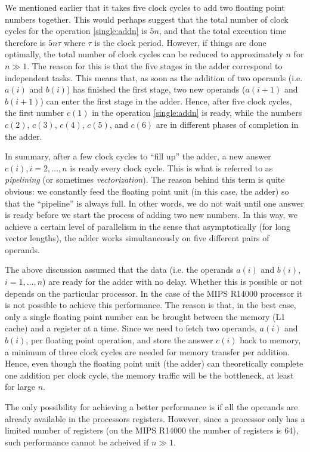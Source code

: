 We mentioned earlier that it takes five clock cycles to add two floating point
numbers together. This would perhaps suggest that the total number of clock
cycles for the operation \eqref{single:addn} is $5n$, and that the total
execution time therefore is $5n\tau$ where $\tau$ is the clock period. However,
if things are done optimally, the total number of clock cycles can be reduced to
approximately $n$ for $n\gg 1$. The reason for this is that the five stages in
the adder correspond to independent tasks. This means that, as soon as the
addition of two operands (i.e. $a(i)$ and $b(i)$) has finished the first stage,
two new operands ($a(i+1)$ and $b(i+1)$) can enter the first stage in the adder.
Hence, after five clock cycles, the first number $c(1)$ in the operation
\eqref{single:addn} is ready, while the numbers $c(2)$, $c(3)$, $c(4)$, $c(5)$,
and $c(6)$ are in different phases of completion in the adder.

In summary, after a few clock cycles to ``fill up'' the adder, a new answer
$c(i), i=2,\ldots,n$ is ready every clock cycle. This is what is referred to as
\emph{pipelining} (or sometimes \emph{vectorization}). The reason behind this
term is quite obvious: we constantly feed the floating point unit (in this case,
the adder) so that the ``pipeline'' is always full. In other words, we do not
wait until one answer is ready before we start the process of adding two new
numbers. In this way, we achieve a certain level of parallelism in the sense
that asymptotically (for long vector lengths), the adder works simultaneously on
five different pairs of operands.

The above discussion assumed that the data (i.e. the operands $a(i)$ and $b(i)$,
$i=1,\ldots,n$) are ready for the adder with no delay. Whether this is possible
or not depends on the particular processor. In the case of the MIPS R14000
processor it is not possible to achieve this performance. The reason is that,
in the best case, only a single floating point number can be brought between the
memory (L1 cache) and a register at a time. Since we need to fetch two operands,
$a(i)$ and $b(i)$, per floating point operation, and store the answer $c(i)$
back to memory, a minimum of three clock cycles are needed for memory transfer
per addition. Hence, even though the floating point unit (the adder) can
theoretically complete one addition per clock cycle, the memory traffic will be
the bottleneck, at least for large $n$.

The only possibility for achieving a better performance is if all the operands
are already available in the processors registers. However, since a processor
only has a limited number of registers (on the MIPS R14000 the number of
registers is 64), such performance cannot be acheived if $n \gg 1$.


